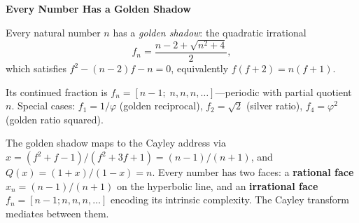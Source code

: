\documentclass[12pt]{article}
\begin{document}
\begin{center}
{\Large\bfseries Every Number Has a Golden Shadow}
\end{center}

\medskip

Every natural number $n$ has a \emph{golden shadow}: the quadratic irrational
\[
f_n = \frac{n-2+\sqrt{n^2+4}}{2},
\]
which satisfies $f^2 - (n{-}2)f - n = 0$, equivalently $f(f{+}2) = n(f{+}1)$.

Its continued fraction is $f_n = [n{-}1;\; n, n, n, \ldots]$---periodic with partial quotient $n$. Special cases: $f_1 = 1/\varphi$ (golden reciprocal), $f_2 = \sqrt{2}$ (silver ratio), $f_4 = \varphi^2$ (golden ratio squared).

The golden shadow maps to the Cayley address via $x = (f^2{+}f{-}1)/(f^2{+}3f{+}1) = (n{-}1)/(n{+}1)$, and $Q(x) = (1{+}x)/(1{-}x) = n$. Every number has two faces: a \textbf{rational face} $x_n = (n{-}1)/(n{+}1)$ on the hyperbolic line, and an \textbf{irrational face} $f_n = [n{-}1; n, n, n, \ldots]$ encoding its intrinsic complexity. The Cayley transform mediates between them.
\end{document}
